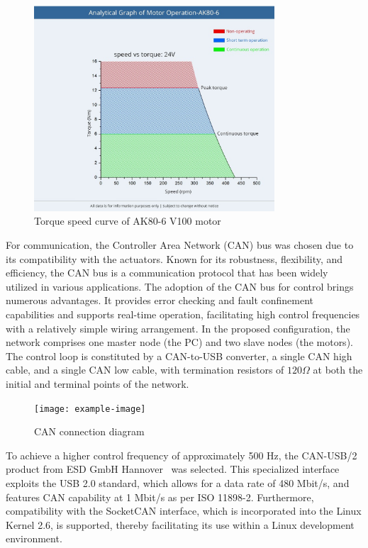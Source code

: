 \begin{figure}[H]
  \centering
  \includegraphics[width=0.80\textwidth]{figures/hardware_setup/torque_speed_curve.jpg}
  \caption{Torque speed curve of AK80-6 V100 motor\cite{cubemarsAK806}}
  \label{fig:torque_speed_curve}
\end{figure}

For communication, the Controller Area Network (CAN) bus was chosen due to its compatibility with the actuators. Known for its robustness, flexibility, and efficiency, the CAN bus is a communication protocol that has been widely utilized in various applications. The adoption of the CAN bus for control brings numerous advantages. It provides error checking and fault confinement capabilities and supports real-time operation, facilitating high control frequencies with a relatively simple wiring arrangement. In the proposed configuration, the network comprises one master node (the PC) and two slave nodes (the motors). The control loop is constituted by a CAN-to-USB converter, a single CAN high cable, and a single CAN low cable, with termination resistors of \(120 \Omega\) at both the initial and terminal points of the network.

\begin{figure}[H]
  \centering
  \texttt{[image: example-image]}
  \caption{CAN connection diagram}
  \label{fig:exampleImage}
\end{figure}

To achieve a higher control frequency of approximately 500 Hz, the CAN-USB/2 product from ESD GmbH Hannover~\cite{esdCANUSB2} was selected. This specialized interface exploits the USB 2.0 standard, which allows for a data rate of 480 Mbit/s, and features CAN capability at 1 Mbit/s as per ISO 11898-2. Furthermore, compatibility with the SocketCAN interface, which is incorporated into the Linux Kernel 2.6, is supported, thereby facilitating its use within a Linux development environment.

